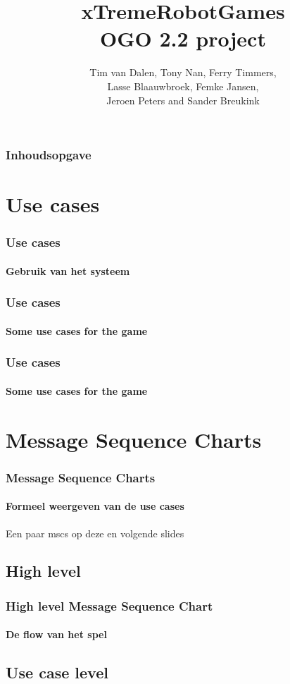 \documentclass{beamer}
\title{xTremeRobotGames\\\small OGO 2.2 project}
\author{Tim van Dalen, Tony Nan, Ferry Timmers,\\
                Lasse Blaauwbroek, Femke Jansen,\\
                Jeroen Peters and Sander Breukink\\}
\institute[TU/e]{}
\begin{document}
	\frame{\titlepage}
	
	\begin{frame}
	    \frametitle{Inhoudsopgave}
    		\tableofcontents
  	\end{frame}

	\section{Use cases}
	\begin{frame}
		\frametitle{Use cases}
		\framesubtitle{Gebruik van het systeem}
		
	\end{frame}

    \begin{frame}
		\frametitle{Use cases}
		\framesubtitle{Some use cases for the game}
		
	\end{frame}

    \begin{frame}
		\frametitle{Use cases}
		\framesubtitle{Some use cases for the game}
		
	\end{frame}

	\section{Message Sequence Charts}
	\begin{frame}
		\frametitle{Message Sequence Charts}
		\framesubtitle{Formeel weergeven van de use cases}
		Een paar mscs op deze en volgende slides
	\end{frame}
	
	\subsection{High level}
	\begin{frame}
		\frametitle{High level Message Sequence Chart}
		\framesubtitle{De flow van het spel}
		
	\end{frame}
	\subsection{Use case level}
\end{document}
